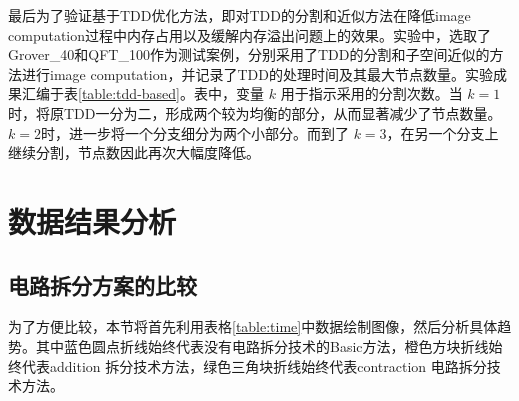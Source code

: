 \begin{table}[]
    \centering
    \caption{TDD拆分与近似的优化方案}

    \label{table:tdd-based}
\end{table}

    最后为了验证基于TDD优化方法，即对TDD的分割和近似方法在降低image computation过程中内存占用以及缓解内存溢出问题上的效果。实验中，选取了Grover\_40和QFT\_100作为测试案例，分别采用了TDD的分割和子空间近似的方法进行image computation，并记录了TDD的处理时间及其最大节点数量。实验成果汇编于表\ref{table:tdd-based}。表中，变量 $k$ 用于指示采用的分割次数。当 $k=1$时，将原TDD一分为二，形成两个较为均衡的部分，从而显著减少了节点数量。$k=2$时，进一步将一个分支细分为两个小部分。而到了 $k=3$，在另一个分支上继续分割，节点数因此再次大幅度降低。
\section{数据结果分析}
\subsection*{电路拆分方案的比较}
为了方便比较，本节将首先利用表格\ref{table:time}中数据绘制图像，然后分析具体趋势。其中蓝色圆点折线始终代表没有电路拆分技术的Basic方法，橙色方块折线始终代表addition 拆分技术方法，绿色三角块折线始终代表contraction 电路拆分技术方法。

